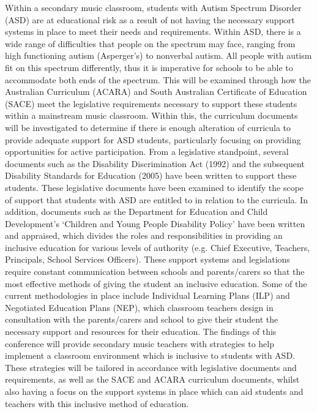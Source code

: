 \documentclass[twoside,14pt,a4paper,notitlepage]{memoir}
\begin{document}
Within a secondary music classroom, students with Autism Spectrum Disorder (ASD) are at educational risk as a result of not having the necessary support systems in place to meet their needs and requirements. Within ASD, there is a wide range of difficulties that people on the spectrum may face, ranging from high functioning autism (Asperger’s) to nonverbal autism. All people with autism fit on this spectrum differently, thus it is imperative for schools to be able to accommodate both ends of the spectrum. This will be examined through how the Australian Curriculum (ACARA) and South Australian Certificate of Education (SACE) meet the legislative requirements necessary to support these students within a mainstream music classroom. Within this, the curriculum documents will be investigated to determine if there is enough alteration of curricula to provide adequate support for ASD students, particularly focusing on providing opportunities for active participation.
From a legislative standpoint, several documents such as the Disability Discrimination Act (1992) and the subsequent Disability Standards for Education (2005) have been written to support these students. These legislative documents have been examined to identify the scope of support that students with ASD are entitled to in relation to the curricula. In addition, documents such as the Department for Education and Child Development’s ‘Children and Young People Disability Policy’ have been written and appraised, which divides the roles and responsibilities in providing an inclusive education for various levels of authority (e.g. Chief Executive, Teachers, Principals, School Services Officers).
These support systems and legislations require constant communication between schools and parents/carers so that the most effective methods of giving the student an inclusive education. Some of the current methodologies in place include Individual Learning Plans (ILP) and Negotiated Education Plans (NEP), which classroom teachers design in consultation with the parents/carers and school to give their student the necessary support and resources for their education.
The findings of this conference will provide secondary music teachers with strategies to help implement a classroom environment which is inclusive to students with ASD. These strategies will be tailored in accordance with legislative documents and requirements, as well as the SACE and ACARA curriculum documents, whilst also having a focus on the support systems in place which can aid students and teachers with this inclusive method of education.
\end{document}
